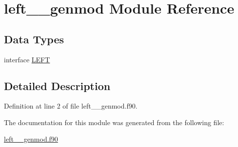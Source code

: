 \hypertarget{classleft____genmod}{\section{left\+\_\+\+\_\+genmod Module Reference}
\label{classleft____genmod}
}
\subsection*{Data Types}
\begin{DoxyCompactItemize}
\item 
interface \hyperlink{interfaceleft____genmod_1_1LEFT}{L\+E\+F\+T}
\end{DoxyCompactItemize}


\subsection{Detailed Description}


Definition at line 2 of file left\+\_\+\+\_\+genmod.\+f90.



The documentation for this module was generated from the following file\+:\begin{DoxyCompactItemize}
\item 
\hyperlink{left____genmod_8f90}{left\+\_\+\+\_\+genmod.\+f90}\end{DoxyCompactItemize}
